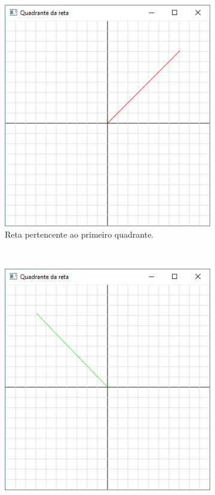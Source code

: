\begin{renumerate}
  \begin{figure}[h!]
    \centering
    \begin{subfigure}[t]{0.2\textwidth}
        \centerline{\includegraphics[width=.9\textwidth]{img/cap1_ex4}}
        \caption{Reta pertencente ao primeiro quadrante.}
        \label{fig:cap01_ex4a}
    \end{subfigure}
    ~
    \begin{subfigure}[t]{0.2\textwidth}
        \centerline{\includegraphics[width=.9\textwidth]{img/cap1_ex4b}}

\end{subfigure}
\end{figure}
\end{renumerate}
